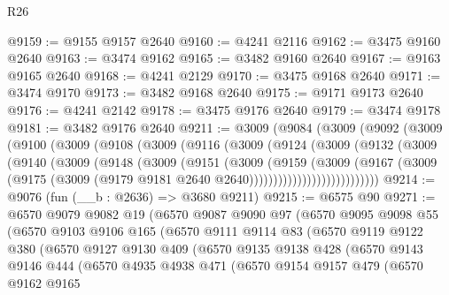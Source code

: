 \begin{lexlean}{R26}
\begin{coremodule}
@9159 := @9155 @9157 @2640
@9160 := @4241 @2116
@9162 := @3475 @9160 @2640
@9163 := @3474 @9162
@9165 := @3482 @9160 @2640
@9167 := @9163 @9165 @2640
@9168 := @4241 @2129
@9170 := @3475 @9168 @2640
@9171 := @3474 @9170
@9173 := @3482 @9168 @2640
@9175 := @9171 @9173 @2640
@9176 := @4241 @2142
@9178 := @3475 @9176 @2640
@9179 := @3474 @9178
@9181 := @3482 @9176 @2640
@9211 := @3009
    (@9084
      (@3009
        (@9092
          (@3009
            (@9100
              (@3009
                (@9108
                  (@3009
                    (@9116
                      (@3009
                        (@9124
                          (@3009
                            (@9132
                              (@3009
                                (@9140
                                  (@3009
                                    (@9148
                                      (@3009
                                        (@9151
                                          (@3009
                                            (@9159
                                              (@3009
                                                (@9167
                                                  (@3009
                                                    (@9175
                                                      (@3009
                                                        (@9179
                                                          @9181
                                                          @2640
                                                          @2640)))))))))))))))))))))))))))
@9214 := @9076 (fun (__b : @2636) => @3680 @9211)
@9215 := @6575 @90
@9271 := @6570
    @9079
    @9082
    @19
    (@6570
      @9087
      @9090
      @97
      (@6570
        @9095
        @9098
        @55
        (@6570
          @9103
          @9106
          @165
          (@6570
            @9111
            @9114
            @83
            (@6570
              @9119
              @9122
              @380
              (@6570
                @9127
                @9130
                @409
                (@6570
                  @9135
                  @9138
                  @428
                  (@6570
                    @9143
                    @9146
                    @444
                    (@6570
                      @4935
                      @4938
                      @471
                      (@6570
                        @9154
                        @9157
                        @479
                        (@6570
                          @9162
                          @9165

\end{coremodule}
\end{lexlean}
